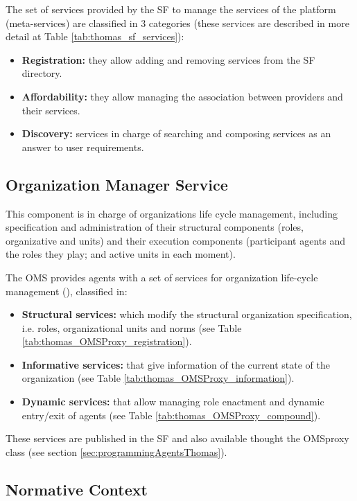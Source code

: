 The set of services provided by the SF to manage the services of the platform (meta-services) are classified in 3 categories (these services are described in more detail at Table \ref{tab:thomas_sf_services}):

\begin{itemize}
	\item \textbf{Registration:} they allow adding and removing services from the SF directory.
	\item \textbf{Affordability:} they allow managing the association between providers and their services.
	\item \textbf{Discovery:} services in charge of searching and composing services as an answer to user requirements.
\end{itemize}



\subsection{Organization Manager Service}
This component is in charge of organizations life cycle management, including specification and administration of their structural components (roles, organizative and units) and their execution components (participant agents and the roles they play; and active units in each moment).

The OMS provides agents with a set of services for organization life-cycle management (\cite{DelVal09}), classified in:

\begin{itemize}
	\item \textbf{Structural services:} which modify the structural organization specification, i.e. roles, organizational units and norms (see Table \ref{tab:thomas_OMSProxy_registration}).
	\item \textbf{Informative services:} that give information of the current state of the organization (see Table \ref{tab:thomas_OMSProxy_information}).
	\item \textbf{Dynamic services:} that allow managing role enactment and dynamic entry/exit of agents (see Table \ref{tab:thomas_OMSProxy_compound}).
\end{itemize}

These services are  published in the SF and also available thought the OMSproxy class (see section \ref{sec:programmingAgentsThomas}).


\subsection{Normative Context}

